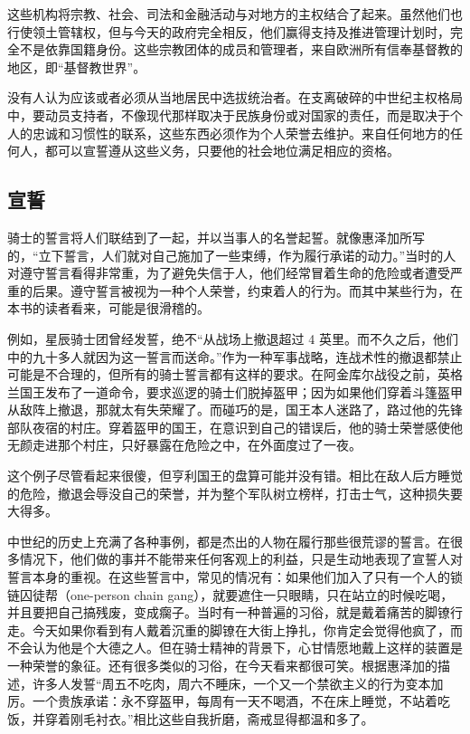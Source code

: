 这些机构将宗教、社会、司法和金融活动与对地方的主权结合了起来。虽然他们也行使领土管辖权，但与今天的政府完全相反，他们赢得支持及推进管理计划时，完全不是依靠国籍身份。这些宗教团体的成员和管理者，来自欧洲所有信奉基督教的地区，即“基督教世界”。

没有人认为应该或者必须从当地居民中选拔统治者。在支离破碎的中世纪主权格局中，要动员支持者，不像现代那样取决于民族身份或对国家的责任，而是取决于个人的忠诚和习惯性的联系，这些东西必须作为个人荣誉去维护。来自任何地方的任何人，都可以宣誓遵从这些义务，只要他的社会地位满足相应的资格。

\subsection{宣誓}
骑士的誓言将人们联结到了一起，并以当事人的名誉起誓。就像惠泽加所写的，“立下誓言，人们就对自己施加了一些束缚，作为履行承诺的动力。”当时的人对遵守誓言看得非常重，为了避免失信于人，他们经常冒着生命的危险或者遭受严重的后果。遵守誓言被视为一种个人荣誉，约束着人的行为。而其中某些行为，在本书的读者看来，可能是很滑稽的。

例如，星辰骑士团曾经发誓，绝不“从战场上撤退超过 4 英里。而不久之后，他们中的九十多人就因为这一誓言而送命。”作为一种军事战略，连战术性的撤退都禁止可能是不合理的，但所有的骑士誓言都有这样的要求。在阿金库尔战役之前，英格兰国王发布了一道命令，要求巡逻的骑士们脱掉盔甲；因为如果他们穿着斗篷盔甲从敌阵上撤退，那就太有失荣耀了。而碰巧的是，国王本人迷路了，路过他的先锋部队夜宿的村庄。穿着盔甲的国王，在意识到自己的错误后，他的骑士荣誉感使他无颜走进那个村庄，只好暴露在危险之中，在外面度过了一夜。

这个例子尽管看起来很傻，但亨利国王的盘算可能并没有错。相比在敌人后方睡觉的危险，撤退会辱没自己的荣誉，并为整个军队树立榜样，打击士气，这种损失要大得多。

中世纪的历史上充满了各种事例，都是杰出的人物在履行那些很荒谬的誓言。在很多情况下，他们做的事并不能带来任何客观上的利益，只是生动地表现了宣誓人对誓言本身的重视。在这些誓言中，常见的情况有：如果他们加入了只有一个人的锁链囚徒帮（one-person chain gang），就要遮住一只眼睛，只在站立的时候吃喝，并且要把自己搞残废，变成瘸子。当时有一种普遍的习俗，就是戴着痛苦的脚镣行走。今天如果你看到有人戴着沉重的脚镣在大街上挣扎，你肯定会觉得他疯了，而不会认为他是个大德之人。但在骑士精神的背景下，心甘情愿地戴上这样的装置是一种荣誉的象征。还有很多类似的习俗，在今天看来都很可笑。根据惠泽加的描述，许多人发誓“周五不吃肉，周六不睡床，一个又一个禁欲主义的行为变本加厉。一个贵族承诺：永不穿盔甲，每周有一天不喝酒，不在床上睡觉，不站着吃饭，并穿着刚毛衬衣。”相比这些自我折磨，斋戒显得都温和多了。

